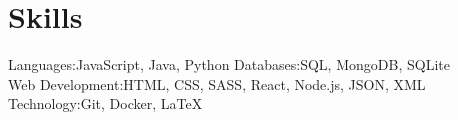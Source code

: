 \documentclass[]{resume-openfont}
\begin{document}
\section{Skills}

\begin{skillList}
    \doubleItem
    {Languages:}{JavaScript, Java, Python}
    {Databases:}{SQL, MongoDB, SQLite}
    \\
    \doubleItem
    {Web Development:}{HTML, CSS, SASS, React, Node.js, JSON, XML}
    {Technology:}{Git, Docker, \LaTeX}
\end{skillList}
\end{document}
